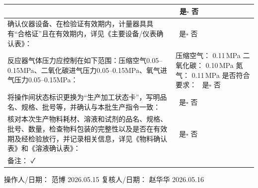 \documentclass[UTF8,10pt,a4paper,fontset=fandol]{ctexart}
\newcommand{\fieldvalue}[1]{#1}
\newcommand{\handwritten}[1]{#1}
\begin{document}
\begin{tabularx}{\textwidth}{|p{}|X|}
&
\fieldvalue{\checkmark}\ 是\quad $\square$ 否
\\
\hline
确认仪器设备、在检验证有效期内，计量器具具有“合格证”且在有效期内，详见《主要设备/仪表确认表》：
&
\fieldvalue{\checkmark}\ 是\quad $\square$ 否
\\
\hline
反应器气体压力应控制在如下范围：压缩空气0.05--0.15MPa、二氧化碳进气压力0.05--0.15MPa、氧气进气压力0.05--0.15MPa：
&
压缩空气：
\fieldvalue{\handwritten{0.11}}\,MPa\newline
二氧化碳：
\fieldvalue{\handwritten{0.10}}\,MPa\quad
氮气：
\fieldvalue{\handwritten{0.11}}\,MPa\newline
是否符合要求：
\fieldvalue{\checkmark}\ 是\quad $\square$ 否
\\
\hline
将操作间状态标识更换为“生产加工状态卡”，写明品名、规格、批号等，并确认与本批生产指令一致：
&
\fieldvalue{\checkmark}\ 是\quad $\square$ 否
\\
\hline
核对本次生产物料耗材、溶液和试剂的品名、规格、批号、数量，检查物料包装的完整性以及是否在有效期及经检验放行，并记录相关信息，详见《物料确认表》和《溶液确认表》：
&
\fieldvalue{\checkmark}\ 是\quad $\square$ 否
\\
\hline
备注：
\handwritten{✓}
&
\\
\hline
\end{tabularx}

\vspace{0.5em}

操作人/日期：
\fieldvalue{\handwritten{范博}}
\quad
\fieldvalue{\handwritten{2026.05.15}}
\qquad
复核人/日期：
\fieldvalue{\handwritten{赵华华}}
\quad
\fieldvalue{\handwritten{2026.05.16}}
\end{document}
